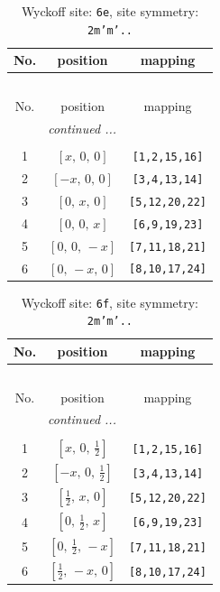 \documentclass[fleqn,8pt]{jsarticle}
\begin{document}
\begin{longtable}{ccc}
\caption{Wyckoff site: {\tt 6e}, site symmetry: {\tt 2m'm'..}}
 \\
 \hline \hline
No. & position & mapping \\ \hline \endfirsthead

\multicolumn{2}{l}{\tablename\ \thetable{}} \\
 \hline \hline
No. & position & mapping \\ \hline \endhead

 \hline \hline
\multicolumn{2}{r}{\footnotesize\it continued ...} \\ \endfoot

 \hline \hline
\multicolumn{2}{r}{} \\ \endlastfoot

1 & $\left[ x,\, 0,\, 0 \right]$ & {\tt [1,2,15,16]} \\ \hline
2 & $\left[ - x,\, 0,\, 0 \right]$ & {\tt [3,4,13,14]} \\ \hline
3 & $\left[ 0,\, x,\, 0 \right]$ & {\tt [5,12,20,22]} \\ \hline
4 & $\left[ 0,\, 0,\, x \right]$ & {\tt [6,9,19,23]} \\ \hline
5 & $\left[ 0,\, 0,\, - x \right]$ & {\tt [7,11,18,21]} \\ \hline
6 & $\left[ 0,\, - x,\, 0 \right]$ & {\tt [8,10,17,24]} \\
\end{longtable}
\renewcommand{\arraystretch}{1.2}
\begin{longtable}{ccc}
\caption{Wyckoff site: {\tt 6f}, site symmetry: {\tt 2m'm'..}}
 \\
 \hline \hline
No. & position & mapping \\ \hline \endfirsthead

\multicolumn{2}{l}{\tablename\ \thetable{}} \\
 \hline \hline
No. & position & mapping \\ \hline \endhead

 \hline \hline
\multicolumn{2}{r}{\footnotesize\it continued ...} \\ \endfoot

 \hline \hline
\multicolumn{2}{r}{} \\ \endlastfoot

1 & $\left[ x,\, 0,\, \frac{1}{2} \right]$ & {\tt [1,2,15,16]} \\ \hline
2 & $\left[ - x,\, 0,\, \frac{1}{2} \right]$ & {\tt [3,4,13,14]} \\ \hline
3 & $\left[ \frac{1}{2},\, x,\, 0 \right]$ & {\tt [5,12,20,22]} \\ \hline
4 & $\left[ 0,\, \frac{1}{2},\, x \right]$ & {\tt [6,9,19,23]} \\ \hline
5 & $\left[ 0,\, \frac{1}{2},\, - x \right]$ & {\tt [7,11,18,21]} \\ \hline
6 & $\left[ \frac{1}{2},\, - x,\, 0 \right]$ & {\tt [8,10,17,24]} \\
\end{longtable}
\end{document}
